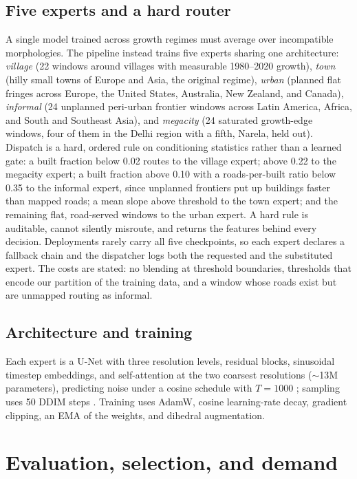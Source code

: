 \documentclass[11pt]{article}
\begin{document}
\subsection{Five experts and a hard router}
\label{sec:moe}
A single model trained across growth regimes must average over
incompatible morphologies. The pipeline instead trains five experts
sharing one architecture: \emph{village} (22 windows around villages
with measurable 1980--2020 growth), \emph{town} (hilly small towns of
Europe and Asia, the original regime), \emph{urban} (planned flat
fringes across Europe, the United States, Australia, New Zealand, and
Canada), \emph{informal} (24 unplanned peri-urban frontier windows
across Latin America, Africa, and South and Southeast Asia), and
\emph{megacity} (24 saturated growth-edge windows, four of them in the
Delhi region with a fifth, Narela, held out). Dispatch is a hard,
ordered rule on conditioning statistics rather than a learned gate: a
built fraction below 0.02 routes to the village expert; above 0.22 to
the megacity expert; a built fraction above 0.10 with a
roads-per-built ratio below 0.35 to the informal expert, since
unplanned frontiers put up buildings faster than mapped roads; a mean
slope above threshold to the town expert; and the remaining flat,
road-served windows to the urban expert. A hard rule is auditable,
cannot silently misroute, and returns the features behind every
decision. Deployments rarely carry all five checkpoints, so each
expert declares a fallback chain and the dispatcher logs both the
requested and the substituted expert. The costs are stated: no
blending at threshold boundaries, thresholds that encode our partition
of the training data, and a window whose roads exist but are unmapped
routing as informal.

\subsection{Architecture and training}
Each expert is a U-Net with three resolution levels, residual blocks,
sinusoidal timestep embeddings, and self-attention at the two coarsest
resolutions ($\sim$13M parameters), predicting noise under a cosine
schedule with $T{=}1000$ \citep{ho2020ddpm, nichol2021improved};
sampling uses 50 DDIM steps \citep{song2021ddim}. Training uses AdamW,
cosine learning-rate decay, gradient clipping, an EMA of the weights,
and dihedral augmentation.

\section{Evaluation, selection, and demand}
\label{sec:eval}
\end{document}
